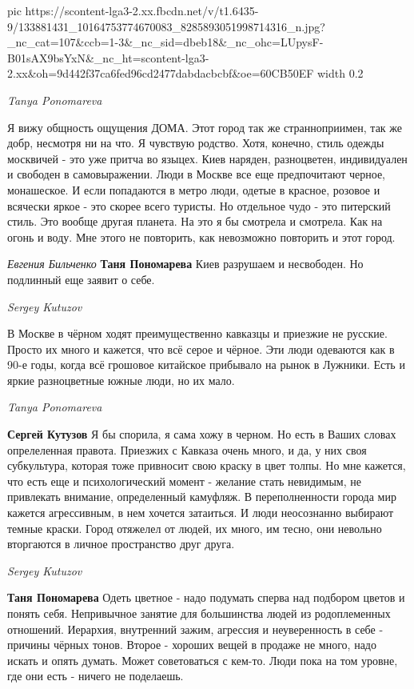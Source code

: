 \ifcmt
  pic https://scontent-lga3-2.xx.fbcdn.net/v/t1.6435-9/133881431_10164753774670083_8285893051998714316_n.jpg?_nc_cat=107&ccb=1-3&_nc_sid=dbeb18&_nc_ohc=LUpysF-B01sAX9bsYxN&_nc_ht=scontent-lga3-2.xx&oh=9d442f37ca6fed96cd2477dabdacbcbf&oe=60CB50EF
	width 0.2
\fi

\emph{Tanya Ponomareva}

Я вижу общность ощущения ДОМА. Этот город так же странноприимен, так же добр,
несмотря ни на что. Я чувствую родство. Хотя, конечно, стиль одежды москвичей -
это уже притча во языцех. Киев наряден, разноцветен, индивидуален и свободен в
самовыражении. Люди в Москве все еще предпочитают черное, монашеское. И если
попадаются в метро люди, одетые в красное, розовое и всячески яркое - это
скорее всего туристы. Но отдельное чудо - это питерский стиль. Это вообще
другая планета. На это я бы смотрела и смотрела. Как на огонь и воду. Мне этого
не повторить, как невозможно повторить и этот город.

\emph{Евгения Бильченко}
\textbf{Таня Пономарева} Киев разрушаем и несвободен. Но подлинный еще заявит о себе.

\emph{Sergey Kutuzov}

В Москве в чёрном ходят преимущественно кавказцы и приезжие не русские. Просто
их много и кажется, что всё серое и чёрное. Эти люди одеваются как в 90-е годы,
когда всё грошовое китайское прибывало на рынок в Лужники. Есть и яркие
разноцветные южные люди, но их мало.

\emph{Tanya Ponomareva}

\textbf{Сергей Кутузов} Я бы спорила, я сама хожу в черном. Но есть в Ваших
словах опрелеленная правота. Приезжих с Кавказа очень много, и да, у них своя
субкультура, которая тоже привносит свою краску в цвет толпы. Но мне кажется,
что есть еще и психологический момент - желание стать невидимым, не привлекать
внимание, определенный камуфляж. В переполненности города мир кажется
агрессивным, в нем хочется затаиться. И люди неосознанно выбирают темные
краски. Город отяжелел от людей, их много, им тесно, они невольно вторгаются в
личное пространство друг друга.

\emph{Sergey Kutuzov}

\textbf{Таня Пономарева} Одеть цветное - надо подумать сперва над подбором
цветов и понять себя. Непривычное занятие для большинства людей из
родоплеменных отношений. Иерархия, внутренний зажим, агрессия и неуверенность в
себе - причины чёрных тонов. Второе - хороших вещей в продаже не много, надо
искать и опять думать. Может советоваться с кем-то. Люди пока на том уровне,
где они есть - ничего не поделаешь.

